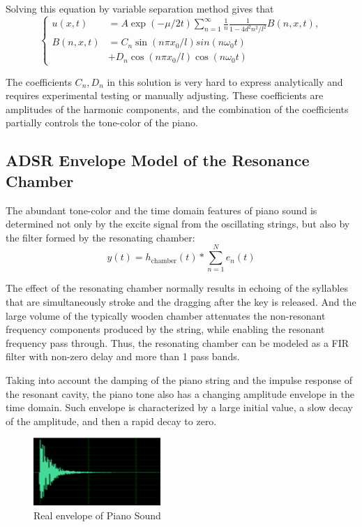 \documentclass[conference]{IEEEtran}
\begin{document}
Solving this equation by variable separation method gives that
\begin{equation}
	\begin{cases}
		u(x,t)   & =A\exp(-\mu/2 t) \sum_{n=1}^{\infty} \frac{1}{n}\frac{1}{1-4d^2n^2/l^2}B(n,x,t), \\
		B(n,x,t) & =C_{n}\sin(n\pi x_{0}/l)sin(n\omega_0 t)                                         \\
		         & +D_{n}\cos(n\pi x_{0}/l)\cos(n\omega_0 t)
	\end{cases}
\end{equation}

The coefficients \(C_{n}, D_{n}\) in this solution is very hard to express analytically and requires experimental testing or manually adjusting. These coefficients are amplitudes of the harmonic components, and the combination of the coefficients partially controls the tone-color of the piano.

\subsection{ADSR Envelope Model of the Resonance Chamber}
The abundant tone-color and the time domain features of piano sound is determined not only by the excite signal from the oscillating strings, but also by the filter formed by the resonating chamber:
\begin{equation}
	y(t)=h_{\text{chamber}}(t)*\sum_{n=1}^{N} e_{n}(t)
\end{equation}

The effect of the resonating chamber normally results in echoing of the syllables that are simultaneously stroke and the dragging after the key is released. And the large volume of the typically wooden chamber attenuates the non-resonant frequency components produced by the string, while enabling the resonant frequency pass through. Thus, the resonating chamber can be modeled as a FIR filter with non-zero delay and more than 1 pass bands.

Taking into account the damping of the piano string and the impulse response of the resonant cavity, the piano tone also has a changing amplitude envelope in the time domain. Such envelope is characterized by a large initial value, a slow decay of the amplitude, and then a rapid decay to zero.

\begin{figure}[htpb]
	\centering
	\includegraphics[width=0.43\textwidth]{adsr_real_piano.png}
	\caption{Real envelope of Piano Sound}
	\label{fig:adsr_real_piano.png}
\end{figure}
\end{document}
